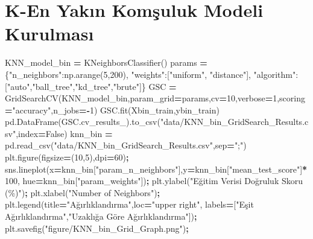 \documentclass[12pt,twoside]{deuthesis}
\newenvironment{Shaded}{\begin{snugshade}}{\end{snugshade}}
\newcommand{\DecValTok}[1]{\textcolor[rgb]{0.00,0.00,0.81}{#1}}
\newcommand{\NormalTok}[1]{#1}
\newcommand{\OperatorTok}[1]{\textcolor[rgb]{0.81,0.36,0.00}{\textbf{#1}}}
\newcommand{\StringTok}[1]{\textcolor[rgb]{0.31,0.60,0.02}{#1}}
\newcommand{\VariableTok}[1]{\textcolor[rgb]{0.00,0.00,0.00}{#1}}
\begin{document}
\hypertarget{k-en-yakux131n-komux15fuluk-modeli-kurulmasux131-1}{%
\section{K-En Yakın Komşuluk Modeli Kurulması}\label{k-en-yakux131n-komux15fuluk-modeli-kurulmasux131-1}}

\scriptsize
\begin{Shaded}
\begin{Highlighting}[]
\NormalTok{KNN\_model\_bin }\OperatorTok{=}\NormalTok{ KNeighborsClassifier()}
\NormalTok{params }\OperatorTok{=}\NormalTok{ \{}\StringTok{"n\_neighbors"}\NormalTok{:np.arange(}\DecValTok{5}\NormalTok{,}\DecValTok{200}\NormalTok{),}
          \StringTok{"weights"}\NormalTok{:[}\StringTok{"uniform"}\NormalTok{, }\StringTok{"distance"}\NormalTok{],}
          \StringTok{"algorithm"}\NormalTok{:[}\StringTok{"auto"}\NormalTok{,}\StringTok{"ball\_tree"}\NormalTok{,}\StringTok{"kd\_tree"}\NormalTok{,}\StringTok{"brute"}\NormalTok{]\}}
\NormalTok{GSC }\OperatorTok{=}\NormalTok{ GridSearchCV(KNN\_model\_bin,param\_grid}\OperatorTok{=}\NormalTok{params,cv}\OperatorTok{=}\DecValTok{10}\NormalTok{,verbose}\OperatorTok{=}\DecValTok{1}\NormalTok{,scoring}\OperatorTok{=}\StringTok{"accuracy"}\NormalTok{,n\_jobs}\OperatorTok{={-}}\DecValTok{1}\NormalTok{)}
\NormalTok{GSC.fit(Xbin\_train,ybin\_train)}
\NormalTok{pd.DataFrame(GSC.cv\_results\_).to\_csv(}\StringTok{"data/KNN\_bin\_GridSearch\_Results.csv"}\NormalTok{,index}\OperatorTok{=}\VariableTok{False}\NormalTok{)}
\NormalTok{knn\_bin }\OperatorTok{=}\NormalTok{ pd.read\_csv(}\StringTok{"data/KNN\_bin\_GridSearch\_Results.csv"}\NormalTok{,sep}\OperatorTok{=}\StringTok{";"}\NormalTok{)}
\NormalTok{plt.figure(figsize}\OperatorTok{=}\NormalTok{(}\DecValTok{10}\NormalTok{,}\DecValTok{5}\NormalTok{),dpi}\OperatorTok{=}\DecValTok{60}\NormalTok{)}\OperatorTok{;}
\NormalTok{sns.lineplot(x}\OperatorTok{=}\NormalTok{knn\_bin[}\StringTok{"param\_n\_neighbors"}\NormalTok{],y}\OperatorTok{=}\NormalTok{knn\_bin[}\StringTok{"mean\_test\_score"}\NormalTok{]}\OperatorTok{*}\DecValTok{100}\NormalTok{,}
\NormalTok{             hue}\OperatorTok{=}\NormalTok{knn\_bin[}\StringTok{"param\_weights"}\NormalTok{])}\OperatorTok{;}
\NormalTok{plt.ylabel(}\StringTok{"Eğitim Verisi Doğruluk Skoru (\%)"}\NormalTok{)}\OperatorTok{;}
\NormalTok{plt.xlabel(}\StringTok{"Number of Neighbors"}\NormalTok{)}\OperatorTok{;}
\NormalTok{plt.legend(title}\OperatorTok{=}\StringTok{"Ağırlıklandırma"}\NormalTok{,loc}\OperatorTok{=}\StringTok{"upper right"}\NormalTok{,}
\NormalTok{           labels}\OperatorTok{=}\NormalTok{[}\StringTok{"Eşit Ağırlıklandırma"}\NormalTok{,}\StringTok{"Uzaklığa Göre Ağırlıklandırma"}\NormalTok{])}\OperatorTok{;}
\NormalTok{plt.savefig(}\StringTok{"figure/KNN\_bin\_Grid\_Graph.png"}\NormalTok{)}\OperatorTok{;}
\end{Highlighting}
\end{Shaded}
\end{document}
